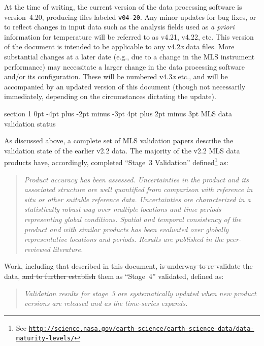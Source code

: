 \documentclass[11pt,draft]{report}
\makeatletter
\renewcommand{\section}{\@startsection%
  {section}%
  {1}%
  {0pt}%
  {-4pt plus -2pt minus -3pt}%
  {4pt plus 2pt minus 3pt}%
  {\Large\sffamily\fontseries{sb}\selectfont\flushleft\color{SectionColor}\figureversion{tabular}}}%
\providecommand{\DIFaddtex}[1]{{\protect\color{blue}\uwave{#1}}} %
\providecommand{\DIFdeltex}[1]{{\protect\color{red}\sout{#1}}}                      %
\providecommand{\DIFaddbegin}{} %
\providecommand{\DIFaddend}{} %
\providecommand{\DIFdelbegin}{} %
\providecommand{\DIFdelend}{} %
\providecommand{\DIFadd}[1]{\texorpdfstring{\DIFaddtex{#1}}{#1}} %
\providecommand{\DIFdel}[1]{\texorpdfstring{\DIFdeltex{#1}}{}} %
\makeatother
\begin{document}
At the time of writing, the current version of the data processing
software is version~4.20, producing files labeled \texttt{v04-20}.  Any
minor updates for bug fixes, or to reflect changes in input data such as
the analysis fields used as \emph{a priori} information for temperature
will be referred to as v4.21, v4.22, etc.  This version of the document
is intended to be applicable to any v4.2\emph{x} data files.  More
substantial changes at a later date (e.g., due to a change in the MLS
instrument performance) may necessitate a larger change in the data
processing software and/or its configuration.  These will be numbered
v4.3\emph{x} etc., and will be accompanied by an updated version of this
document (though not necessarily immediately, depending on the
circumstances dictating the update).

\section{MLS data validation status}

As discussed above, a complete set of MLS validation papers describe the
validation state of the earlier v2.2 data.  The majority of the v2.2 MLS
data products have, accordingly, completed ``Stage~3 Validation''
defined\footnote{See
  \href{http://science.nasa.gov/earth-science/earth-science-data/data-maturity-levels/}%
  {\texttt{http://science.nasa.gov/earth-science/earth-science-data/data-maturity-levels/}}}
as:
\begin{quote}\itshape
  Product accuracy has been assessed.  Uncertainties in the product and
  its associated structure are well quantified from comparison with
  reference in situ or other suitable reference data. Uncertainties are
  characterized in a statistically robust way over multiple locations
  and time periods representing global conditions.  Spatial and temporal
  consistency of the product and with similar products has been
  evaluated over globally representative locations and periods.  Results
  are published in the peer-reviewed literature.
\end{quote}
Work, including that described in this document, \DIFdelbegin \DIFdel{is underway to
re-validate }\DIFdelend \DIFaddbegin \DIFadd{has re-validated }\DIFaddend the
\thisv data, \DIFdelbegin \DIFdel{and to further establish }\DIFdelend \DIFaddbegin \DIFadd{establishing }\DIFaddend them as ``Stage~4'' validated, defined as:
\begin{quote}\itshape
  Validation results for stage~3 are systematically updated when new
  product versions are released and as the time-series expands.
\end{quote}
\end{document}
